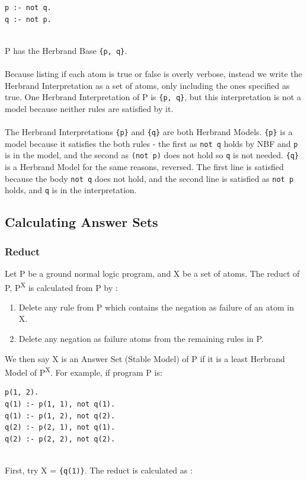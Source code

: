 \begin{lstlisting}
p :- not q.
q :- not p.
\end{lstlisting}
\mbox{}\\
P has the Herbrand Base \lstinline!{p, q}!. \\ \\ 
Because listing if each atom is true or false is overly verbose, instead we write the Herbrand Interpretation as a set of atoms, only including the ones specified as true. One Herbrand Interpretation of P is \lstinline!{p, q}!, but this interpretation is not a model because neither rules are satisfied by it. \\ \\
The Herbrand Interpretations \lstinline!{p}! and \lstinline!{q}! are both Herbrand Models. \lstinline!{p}! is a model because it satisfies the both rules - the first as \lstinline!not q! holds by NBF and \lstinline!p! is in the model, and the second as \lstinline!(not p)! does not hold so \lstinline!q! is not needed. \lstinline!{q}! is a Herbrand Model for the same reasons, reversed. The first line is satisfied because the body \lstinline!not q! does not hold, and the second line is satisfied as \lstinline!not p! holds, and \lstinline!q! is in the interpretation.

\subsection{Calculating Answer Sets}

\subsubsection{Reduct}

Let P be a ground normal logic program, and X be a set of atoms. The reduct \cite{Law2015} of P, P\textsuperscript{X} is calculated from P by :

\begin{enumerate}
\item Delete any rule from P which contains the negation as failure of an atom in X.
\item Delete any negation as failure atoms from the remaining rules in P.
\end{enumerate}
We then say X is an Answer Set (Stable Model) of P if it is a least Herbrand Model of  P\textsuperscript{X}. For example, if program P is:\\

\begin{lstlisting}
p(1, 2).
q(1) :- p(1, 1), not q(1).
q(1) :- p(1, 2), not q(2).
q(2) :- p(2, 1), not q(1).
q(2) :- p(2, 2), not q(2).
\end{lstlisting}
\mbox{}\\
First, try X = \lstinline!{q(1)}!. The reduct is calculated as : \\

